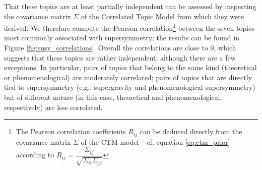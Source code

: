 \documentclass[smallextended]{svjour3}
\begin{document}
%     

That these topics are at least partially independent can be assessed by inspecting the covariance matrix $\Sigma$ of the Correlated Topic Model from which they were derived. We therefore compute the Pearson correlation\footnote{The Pearson correlation coefficients $R_{ij}$ can be deduced directly from the covariance matrix $\Sigma$ of the CTM model -- cf. equation \eqref{eq:ctm_prior} -- according to $R_{ij} = \dfrac{\Sigma_{ij}}{\sqrt{\Sigma_{ii}\Sigma_{jj}}}$} between the seven topics most commonly associated with supersymmetry; the results can be found in Figure \ref{fig:susy_correlations}. Overall the correlations are close to 0, which suggests that these topics are rather independent, although there are a few exceptions. In particular, pairs of topics that belong to the same kind (theoretical or phenomenological) are moderately correlated; pairs of topics that are directly tied to supersymmetry (e.g., supergravity and phenomenological supersymmetry) but of different nature (in this case, theoretical and phenomenological, respectively) are less correlated.

\begin{figure*}
    \centering
    \hspace*{-2em}
    \caption{\textbf{Correlation between the topics most associated to supersymmetry}. The Pearson correlation is comprised between -1 (perfect anti-correlation) and 1 (perfect correlation). A correlation close to 0 means that a pair of topic is partially independent, i.e. that they can arise or not in variable proportions in a paper.}
    \label{fig:susy_correlations}
\end{figure*}
\end{document}

